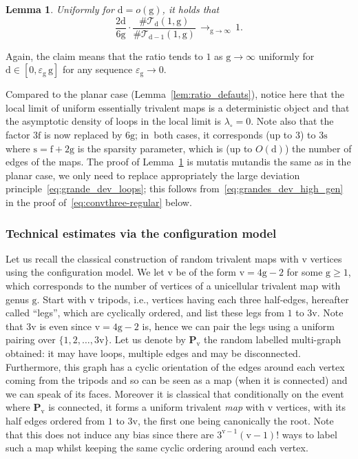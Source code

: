 \documentclass[11pt]{article}
\newcommand{\ie}{i.e.,\xspace}
\theoremstyle{plain}
\newtheorem{lemma}[theorem]{Lemma}
\theoremstyle{definition}
\theoremstyle{remark}
\newcommand{\face}{\mathrm{f}}
\newcommand{\defect}{\mathrm{d}}
\newcommand{\gen}{\mathrm{g}}
\newcommand{\ver}{\mathrm{v}}
\newcommand{\spar}{\mathrm{s}}
\newcommand{\cv}[1][n]{\,\mathop{\longrightarrow}^{}_{#1 \to \infty}\,}
\begin{document}
\begin{lemma}\label{lem:ratio_defauts_genus}
Uniformly for $\defect = o(\gen)$, it holds that
\[
\frac{2 \defect}{6 \gen} \cdot \frac{\#\mathcal{T}_{\defect}(1,\gen)}{\#\mathcal{T}_{\defect-1}(1,\gen)} \cv[\gen] 1.
\]
\end{lemma}

Again, the claim means that the ratio tends to $1$ as $\gen \to \infty$ uniformly for $\defect \in [0, \varepsilon_\gen\, \gen ]$ for any sequence $\varepsilon_\gen \to 0$.

Compared to the planar case (Lemma~\ref{lem:ratio_defauts}), notice here that the local limit of uniform essentially trivalent maps is a deterministic object and that the asymptotic density of loops in the local limit is $\lambda_\circ = 0$. Note also that the factor $3\face$ is now replaced by $6\gen$; in~both cases, it corresponds (up to $3$) to $3\spar$ where $\spar=\face+2\gen$ is the sparsity parameter, which is (up to $O(\defect)$) the number of edges of the maps.
The proof of Lemma~\ref{lem:ratio_defauts_genus} is mutatis mutandis the same as in the planar case, we only need to replace appropriately the large deviation principle~\eqref{eq:grande_dev_loops}; this follows from~\eqref{eq:grandes_dev_high_gen} in the proof of~\eqref{eq:convthree-regular} below.

\subsubsection{Technical estimates via the configuration model}

Let us recall the classical construction of random trivalent maps with $ \ver$ vertices using the configuration model. We let $ \ver$ be of the form $ \ver = 4 \gen -2$ for some $\gen \geq 1$, which corresponds to the number of vertices of a unicellular trivalent map with genus $\gen$.
Start with $ \ver$ tripods, \ie vertices having each three half-edges, hereafter called ``legs'', which are cyclically ordered, and list these legs from $1$ to $3\ver$. Note that $3 \ver$ is even since $ \ver = 4 \gen-2$ is, hence we can pair the legs using a uniform pairing over $\{1,2, \dots, 3 \ver\}$. Let us denote by $\mathbf{P}_{\ver}$ the random labelled multi-graph obtained: it may have loops, multiple edges and may be disconnected. Furthermore, this graph has a cyclic orientation of the edges around each vertex coming from the tripods and so can be seen as a map (when it is connected) and we can speak of its faces. Moreover it is classical that conditionally on the event where $\mathbf{P}_{\ver}$ is connected, it forms a uniform trivalent \emph{map} with $\ver$ vertices, with its half edges ordered from $1$ to $3\ver$, the first one being canonically the root. Note that this does not induce any bias since there are $3^{\ver-1} (\ver-1)!$ ways to label such a map whilst keeping the same cyclic ordering around each vertex.
\end{document}
